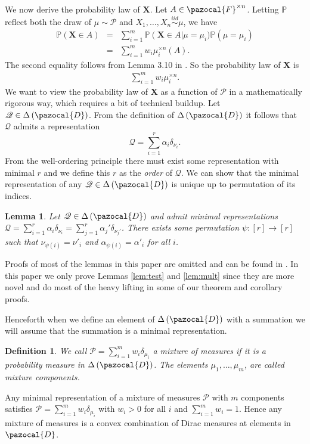 \documentclass[aos,preprint]{imsart}
\def\sF{\pazocal{F}}
\def\sD{\pazocal{D}}
\def\sP{\mathscr{P}}
\def\sQ{\mathscr{Q}}
\def\bX{\mathbf{X}}
\def\pr{\mathbb{P}}
\def\dd{\Delta\left( \sD \right)}
\def\simiid{\overset{iid}{\sim}}
\theoremstyle{plain}
\newtheorem{lem}{Lemma}[section]
\theoremstyle{defintion}
\newtheorem{defin}{Definition}[section]
\begin{document}
	We now derive the probability law of $\bX$. Let $A\in \sF^{\times n}$. Letting $\pr$ reflect both the draw of $\mu\sim \sP$ and $X_1,\ldots,X_n \simiid \mu$, we have
	\begin{eqnarray*}
		\pr\left(\bX \in A \right)
		&=& \sum_{i=1}^m \pr\left( \bX \in A \right|\mu=\mu_i) \pr\left( \mu=\mu_i \right)\\
	 &=&  \sum_{i=1}^m w_i \mu_i^{\times n}\left( A \right).
	\end{eqnarray*}
	The second equality follows from Lemma 3.10 in \cite{fomp}.
	So the probability law of $\bX$ is 
	\begin{eqnarray*}
		\sum_{i=1}^m w_i \mu_i^{\times n}. 
	\end{eqnarray*}
	We want to view the probability law of $\bX$ as a function of $\sP$ in a mathematically rigorous way, which requires a bit of technical buildup.
	Let $\sQ\in \dd$. From the definition of $\dd$ it follows that $\sQ$ admits a representation $$\sQ = \sum_{i=1}^r \alpha_i\delta_{\nu_i} .$$
	From the well-ordering principle there must exist some representation with minimal $r$ and we define this $r$ as the {\it order} of $\sQ$. We can show that the minimal representation of any $\sQ \in \dd$ is unique up to permutation of its indices.

	\begin{lem} \label{lem:represent}
		Let $\sQ\in \dd$ and admit minimal representations $\sQ = \sum_{i=1}^r  \alpha_i \delta_{\nu_i}= \sum_{j=1}^r \alpha_j'\delta_{\nu_j'}$. There exists some permutation $\psi:\left[ r \right] \to \left[ r \right]$ such that $\nu_{\psi\left( i \right)} = \nu'_i$ and $\alpha_{\psi\left( i \right)} = \alpha'_i$ for all $i$.
	\end{lem}
        Proofs of most of the lemmas in this paper are omitted and can be found in \cite{arxiv16}. In this paper we only prove Lemmas \ref{lem:test} and \ref{lem:mult} since they are more novel and do most of the heavy lifting in some of our theorem and corollary proofs.

	Henceforth when we define an element of $\dd$ with a summation we will assume that the summation is a minimal representation.
	\begin{defin} \label{def:mixmeasure}
		We call $\sP =\sum_{i=1}^m w_i \delta_{\mu_i}$ a {\em mixture of measures} if it is a probability measure in $\dd$. The elements $\mu_1,\ldots,\mu_m$, are called {\em mixture components}.
	\end{defin}

	Any minimal representation of a mixture of measures $\sP$ with $m$ components satisfies $\sP=\sum_{i=1}^m w_i \delta_{\mu_i}$ with $w_i>0$ for all $i$ and $\sum_{i=1}^m w_i = 1$. Hence any mixture of measures is a convex combination of Dirac measures at elements in $\sD$.
\end{document}
